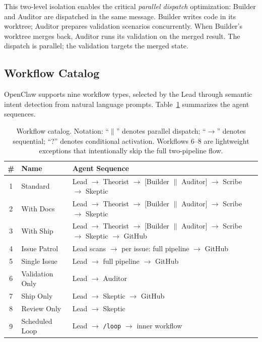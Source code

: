 This two-level isolation enables the critical \emph{parallel dispatch}
optimization: Builder and Auditor are dispatched in the same message.
Builder writes code in its worktree; Auditor prepares validation
scenarios concurrently. When Builder's worktree merges back, Auditor
runs its validation on the merged result. The dispatch is parallel;
the validation targets the merged state.


\subsection{Workflow Catalog}
\label{sec:workflows}

OpenClaw supports nine workflow types, selected by the Lead through
semantic intent detection from natural language prompts.
Table~\ref{tab:workflows} summarizes the agent sequences.

\begin{table}[!t]
\centering
\caption{%
  Workflow catalog. Notation: ``$\parallel$'' denotes parallel
  dispatch; ``$\to$'' denotes sequential; ``?'' denotes conditional
  activation. Workflows 6--8 are lightweight exceptions that
  intentionally skip the full two-pipeline flow.
}
\label{tab:workflows}
\small
\begin{tabular}{@{}clp{6cm}@{}}
\toprule
\textbf{\#} & \textbf{Name} & \textbf{Agent Sequence} \\
\midrule
1 & Standard &
  Lead $\to$ Theorist $\to$ [Builder $\parallel$ Auditor]
  $\to$ Scribe $\to$ Skeptic \\
2 & With Docs &
  Lead $\to$ Theorist $\to$ [Builder $\parallel$ Auditor]
  $\to$ Scribe $\to$ Skeptic \\
3 & With Ship &
  Lead $\to$ Theorist $\to$ [Builder $\parallel$ Auditor]
  $\to$ Scribe $\to$ Skeptic $\to$ GitHub \\
4 & Issue Patrol &
  Lead scans $\to$ per issue: full pipeline $\to$ GitHub \\
5 & Single Issue &
  Lead $\to$ full pipeline $\to$ GitHub \\
6 & Validation Only &
  Lead $\to$ Auditor \\
7 & Ship Only &
  Lead $\to$ Skeptic $\to$ GitHub \\
8 & Review Only &
  Lead $\to$ Skeptic \\
9 & Scheduled Loop &
  Lead $\to$ \texttt{/loop} $\to$ inner workflow \\
\bottomrule
\end{tabular}
\end{table}



